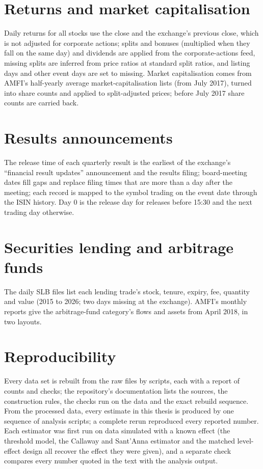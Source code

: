 \section{Returns and market capitalisation}
Daily returns for all stocks use the close and the exchange's previous close, which is not adjusted for corporate actions;
splits and bonuses (multiplied when they fall on the same day) and dividends are applied from the corporate-actions feed,
missing splits are inferred from price ratios at standard split ratios, and listing days and other event days are set to
missing. Market capitalisation comes from AMFI's half-yearly average market-capitalisation lists (from July 2017), turned
into share counts and applied to split-adjusted prices; before July 2017 share counts are carried back.

\section{Results announcements}
The release time of each quarterly result is the earliest of the exchange's ``financial result updates'' announcement and
the results filing; board-meeting dates fill gaps and replace filing times that are more than a day after the meeting; each
record is mapped to the symbol trading on the event date through the ISIN history. Day 0 is the release day for releases
before 15:30 and the next trading day otherwise.

\section{Securities lending and arbitrage funds}
The daily SLB files list each lending trade's stock, tenure, expiry, fee, quantity and value (2015 to 2026; two days missing
at the exchange). AMFI's monthly reports give the arbitrage-fund category's flows and assets from April 2018, in two
layouts.

\section{Reproducibility}
Every data set is rebuilt from the raw files by scripts, each with a report of counts and checks; the repository's
documentation lists the sources, the construction rules, the checks run on the data and the exact rebuild sequence.
From the processed data, every estimate in this thesis is produced by one sequence of analysis scripts; a complete rerun reproduced every reported number. Each estimator was first run on data
simulated with a known effect (the threshold model, the Callaway and Sant'Anna estimator and the matched level-effect
design all recover the effect they were given), and a separate check compares every number quoted in the text with the
analysis output.
